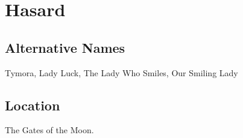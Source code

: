 \section*{Hasard}
\subsection*{Alternative Names}
Tymora, Lady Luck, The Lady Who Smiles, Our Smiling Lady
\subsection*{Location}
The Gates of the Moon.